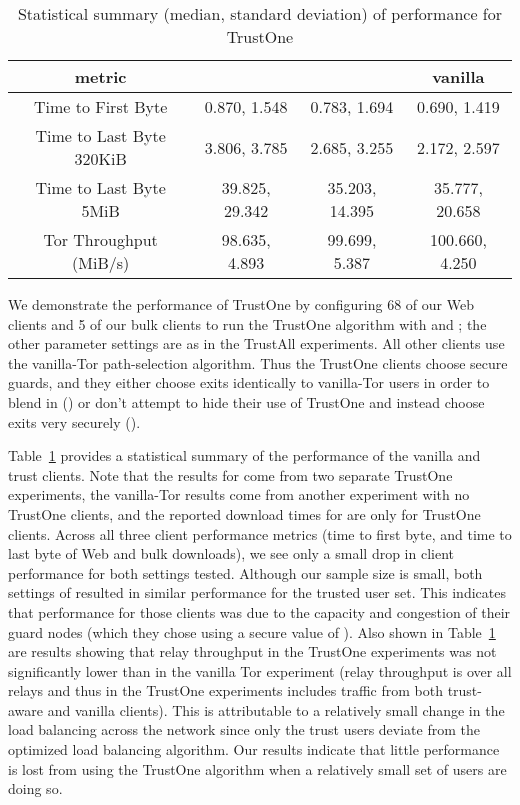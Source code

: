 \documentclass[conference]{styles/IEEEtran}
\begin{document}
\begin{table}
\begin{center}
\begin{tabular}{|c||c|c|c|}\hline
metric &  &  & vanilla \\ \hline
\hline
Time to First Byte       & 0.870, 1.548   & 0.783, 1.694   & 0.690, 1.419 \\ \hline
Time to Last Byte 320KiB & 3.806, 3.785   & 2.685, 3.255   & 2.172, 2.597 \\ \hline
Time to Last Byte 5MiB   & 39.825, 29.342 & 35.203, 14.395 & 35.777, 20.658 \\ \hline
Tor Throughput (MiB/s)   & 98.635, 4.893  & 99.699, 5.387  & 100.660, 4.250 \\ \hline
\end{tabular}
\end{center}
\caption{\small Statistical summary (median, standard deviation) of performance for TrustOne}\label{tab:perf-trust-one}
\vspace{-4mm}
\end{table}

We demonstrate the performance of TrustOne by configuring 68 of our Web clients
and 5 of our bulk clients to run the
TrustOne algorithm with  and
; the other parameter settings are as in the
TrustAll experiments. All other clients use the vanilla-Tor path-selection
algorithm. Thus the TrustOne clients choose secure guards, and they either choose exits
identically to vanilla-Tor users in order to blend in ()
or don't attempt to hide their use of TrustOne and instead choose exits very securely
().



Table~\ref{tab:perf-trust-one} provides a statistical summary of the performance of 
the vanilla and trust clients. Note that
the results for  come from two separate TrustOne experiments,
the vanilla-Tor results come from another experiment with no TrustOne clients, and
the reported download times for  are only for TrustOne clients.
Across all three client performance metrics (time to first byte, and
time to last byte of Web and bulk downloads), we see only a small drop
in client performance for both settings tested. Although our sample size is
small, both settings of  resulted in similar performance for the
trusted user set. This indicates that performance for those clients was due to
the capacity and congestion of their guard nodes (which they chose using a
secure value of ). Also shown in Table~\ref{tab:perf-trust-one} are
results showing that relay throughput in the TrustOne experiments
was not significantly lower than in the vanilla Tor experiment
(relay throughput is over all relays and thus in the TrustOne experiments includes
traffic from both trust-aware and vanilla clients).
This is attributable to a relatively small change in the load balancing across
the network since only the trust users deviate from the optimized load balancing
algorithm. Our results indicate that little performance is lost from using the
TrustOne algorithm when a relatively small set of users are doing so.
 
\end{document}
